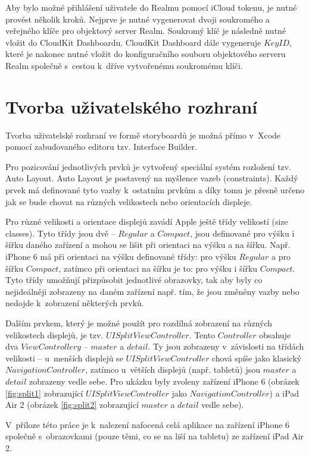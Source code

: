 \documentclass[thesis=M,czech]{FITthesis}[2012/06/26]
\begin{document}
Aby bylo možné přihlášení uživatele do Realmu pomocí iCloud tokenu, je nutné provést několik kroků. Nejprve je nutné vygenerovat dvoji soukromého a veřejného klíče pro objektový server Realm. Soukromý klíč je následně nutné vložit do CloudKit Dashboardu. CloudKit Dashboard dále vygeneruje $Key ID$, které je nakonec nutné vložit do konfiguračního souboru objektového serveru Realm společně s~cestou k~dříve vytvořenému soukromému klíči. \cite{realmObjS}

\section{Tvorba uživatelského rozhraní}
Tvorba uživatelské rozhraní ve formě storyboardů je možná přímo v~Xcode pomocí zabudovaného editoru tzv. Interface Builder.

Pro pozicování jednotlivých prvků je vytvořený speciální systém rozložení tzv. Auto Layout. Auto Layout je postavený na myšlence vazeb (constraints). Každý prvek má definované tyto vazby k~ostatním prvkům a díky tomu je přesně určeno jak se bude chovat na různých velikostech nebo orientacích displeje. \cite{ib}

Pro různé velikosti a orientace displejů zavádí Apple ještě třídy velikostí (size classes). Tyto třídy jsou dvě -- $Regular$ a $Compact$, jsou definované pro výšku i šířku daného zařízení a mohou se lišit při orientaci na výšku a na šířku. Např. iPhone 6 má při orientaci na výšku definované třídy: pro výšku $Regular$ a pro šířku $Compact$, zatímco při orientaci na šířku je to: pro výšku i šířku $Compact$. Tyto třídy umožňují přizpůsobit jednotlivé obrazovky, tak aby byly co nejideálněji zobrazeny na daném zařízení např. tím, že jsou změněny vazby nebo nedojde k~zobrazení některých prvků. \cite{sizeClasses}

Dalším prvkem, který je možné použít pro rozdílná zobrazení na různých velikostech displejů, je tzv. $UISplitViewController$. Tento $Controller$ obsahuje dva $ViewControllery$ -- $master$ a $detail$. Ty jsou zobrazeny v~závislosti na třídách velikosti -- u~menších displejů se $UISplitViewController$ chová spíše jako klasický $NavigationController$, zatímco u~větších displejů (např. tabletů) jsou $master$ a $detail$ zobrazeny vedle sebe. \cite{splitVC} Pro ukázku byly zvoleny zařízení iPhone 6 (obrázek \ref{fig:split1} zobrazující $UISplitViewController$ jako $NavigationController$) a iPad Air 2 (obrázek \ref{fig:split2} zobrazující $master$ a $detail$ vedle sebe).

V~příloze této práce je k~nalezení nafocená celá aplikace na zařízení iPhone 6 společně s~obrazovkami (pouze těmi, co se na liší na tabletu) ze zařízení iPad Air 2. 
\end{document}
